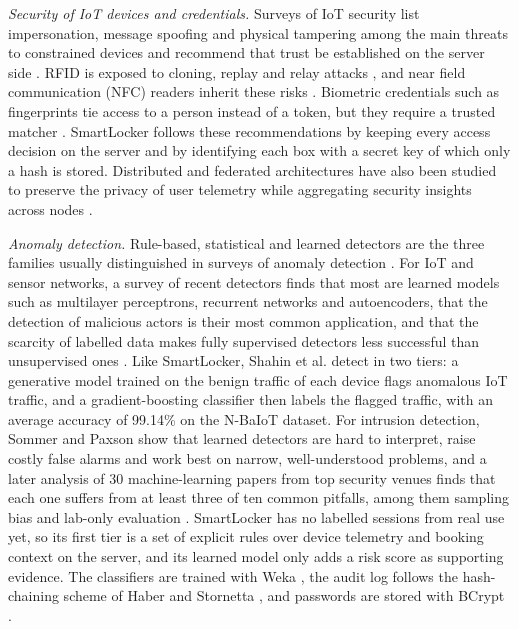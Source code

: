 \textit{Security of IoT devices and credentials.} Surveys of IoT security list impersonation, message spoofing and
physical tampering among the main threats to constrained devices \cite{abomhara2015cyber} and recommend that trust be
established on the server side \cite{sicari2015security}. RFID \cite{want2006rfid} is exposed to cloning, replay and
relay attacks \cite{mitrokotsa2010rfid}, and near field communication (NFC) readers inherit these risks
\cite{coskun2013nfc}. Biometric credentials such as fingerprints tie access to a person instead of a token, but they
require a trusted matcher \cite{jain2004biometric}. SmartLocker follows these recommendations by keeping every access
decision on the server and by identifying each box with a secret key of which only a hash is stored. Distributed and
federated architectures have also been studied to preserve the privacy of user telemetry while aggregating security
insights across nodes \cite{shahin2025twostage}.

\textit{Anomaly detection.} Rule-based, statistical and learned detectors are the three families usually distinguished
in surveys of anomaly detection \cite{chandola2009anomaly, ahmed2016survey}. For IoT and sensor networks, a survey of
recent detectors finds that most are learned models such as multilayer perceptrons, recurrent networks and
autoencoders, that the detection of malicious actors is their most common application, and that the scarcity of
labelled data makes fully supervised detectors less successful than unsupervised ones \cite{demedeiros2023anomaly}.
Like SmartLocker, Shahin et al. \cite{shahin2025twostage} detect in two tiers: a generative model trained on the benign
traffic of each device flags anomalous IoT traffic, and a gradient-boosting classifier then labels the flagged traffic,
with an average accuracy of 99.14\% on the N-BaIoT dataset. For intrusion detection, Sommer and Paxson
\cite{sommer2010outside} show that learned detectors are hard to interpret, raise costly false alarms and work best on
narrow, well-understood problems, and a later analysis of 30 machine-learning papers from top security venues finds
that each one suffers from at least three of ten common pitfalls, among them sampling bias and lab-only evaluation
\cite{arp2024pitfalls}. SmartLocker has no labelled sessions from real use yet, so its first tier is a set of explicit
rules over device telemetry and booking context on the server, and its learned model only adds a risk score as
supporting evidence. The classifiers are trained with Weka
\cite{hall2009weka}, the audit log follows the hash-chaining scheme of Haber and Stornetta \cite{haber1991timestamp},
and passwords are stored with BCrypt \cite{provos1999bcrypt}.

